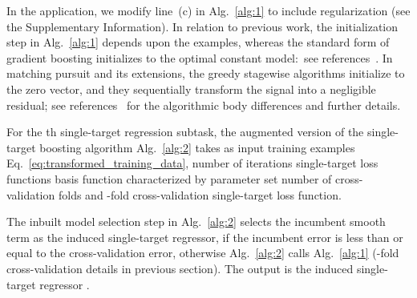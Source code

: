 \documentclass[aps,twocolumn,superscriptaddress,floatfix,preprintnumbers,showkeys]{revtex4}
\begin{document}
In the application, we modify line~(c) in Alg.~\ref{alg:1} to include  regularization (see the Supplementary Information). In relation to previous work, the initialization step in Alg.~\ref{alg:1} depends upon the examples, whereas the standard form of gradient boosting initializes to the optimal constant model:\
 see references~\cite{Friedman_2001, Friedman_2003, Hastie_2009}. In matching pursuit and its extensions, the greedy stagewise algorithms initialize to the zero vector, and they sequentially transform the signal into a negligible residual; see references~\cite{Mallat_1993, Vincent_2002, Donoho_2012} for the algorithmic body differences and further details. 

For the th single-target regression subtask, the augmented version of the single-target boosting algorithm Alg.~\ref{alg:2} takes as input training examples Eq.~\ref{eq:transformed_training_data}, number of iterations  single-target loss functions  basis function  characterized by parameter set  number of cross-validation folds  and -fold cross-validation single-target loss function. 
\begin{figure*}
\begin{minipage}{\linewidth}
\begin{algorithm}[H]
\SetAlgoLined
{}
\SetKwInOut{Output}{Output}
\caption{}
\label{alg:2}
\end{algorithm}
\end{minipage}
\end{figure*}
The inbuilt model selection step in Alg.~\ref{alg:2} selects the incumbent smooth term as the induced single-target regressor, if the incumbent error is less than or equal to the cross-validation error, otherwise Alg.~\ref{alg:2} calls Alg.~\ref{alg:1} (-fold cross-validation details in previous section). The output is the induced single-target regressor . 
\end{document}
